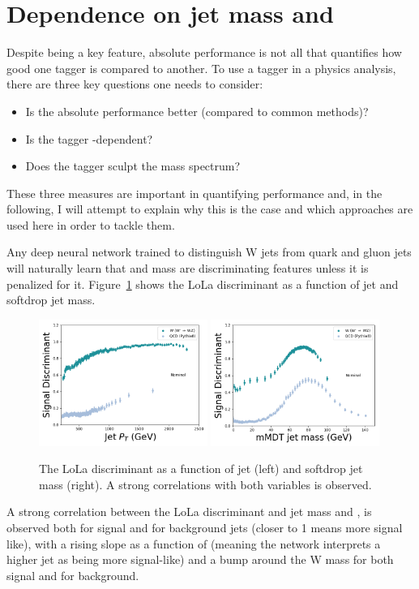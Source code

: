 \section{Dependence on jet mass and \PT}
Despite being a key feature, absolute performance is not all that quantifies how good one tagger is compared to another. To use a tagger in a physics analysis, there are three key questions one needs to consider:
\begin{itemize}
    \itemsep0em 
    \item Is the absolute performance better (compared to common methods)?
    \item Is the tagger \PT-dependent?
    \item Does the tagger sculpt the mass spectrum?
\end{itemize}
These three measures are important in quantifying performance and, in the following, I will attempt to explain why this is the case and which approaches are used here in order to tackle them.\par
Any deep neural network trained to distinguish W jets from quark and gluon jets will naturally learn that \PT and mass are discriminating features unless it is penalized for it. Figure~\ref{fig:lola:corr} shows the LoLa discriminant as a function of jet \PT and softdrop jet mass. 
\begin{figure}[h!]
\centering
\includegraphics[width=0.49\textwidth]{figures/vtagging/lola/wLola_v6_500rew-profile-jpt.png}
\includegraphics[width=0.49\textwidth]{figures/vtagging/lola/wLola_v6_500rew-profile-jsd0.png}
\caption{The LoLa discriminant as a function of jet \PT (left) and softdrop jet mass (right). A strong correlations with both variables is observed.}
\label{fig:lola:corr}
\end{figure}
A strong correlation between the LoLa discriminant and jet mass and \PT, is observed both for signal and for background jets (closer to 1 means more signal like), with a rising slope as a function of \PT (meaning the network interprets a higher jet \PT as being more signal-like) and a bump around the W mass for both signal and for background.

